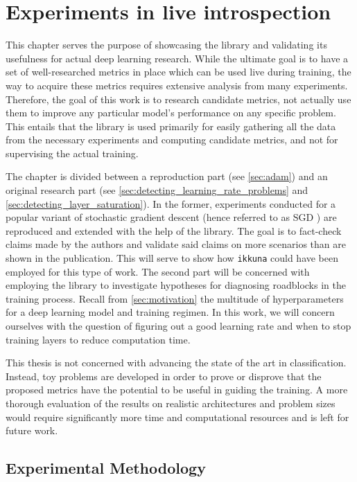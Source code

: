 \chapter{Experiments in live introspection}
\label{ch:experiments}

This chapter serves the purpose of showcasing the library and validating its
usefulness for actual deep learning research. While the ultimate goal is to have
a set of well-researched metrics in place which can be used live during
training, the way to acquire these metrics requires extensive analysis from many
experiments. Therefore, the goal of this work is to research candidate metrics,
not actually use them to improve any particular model's performance on any
specific problem. This entails that the library is used primarily for easily
gathering all the data from the necessary experiments and computing candidate
metrics, and not for supervising the actual training.

The chapter is divided between a reproduction part (see
\cref{sec:adam}) and an original research part (see
\cref{sec:detecting_learning_rate_problems} and
\cref{sec:detecting_layer_saturation}). In the former, experiments conducted
for a popular variant of stochastic gradient descent (hence referred to as SGD
) are reproduced and extended with
the help of the library. The goal is to fact-check claims made by the authors
and validate said claims on more scenarios than are shown in the
publication. This will serve to show how \texttt{ikkuna} could have been
employed for this type of work. The second part will be concerned with employing
the library to investigate hypotheses for diagnosing roadblocks in the training
process. Recall from \cref{sec:motivation} the multitude of hyperparameters
for a deep learning model and training regimen. In this work, we will concern
ourselves with the question of figuring out a good learning rate and when to
stop training layers to reduce computation time.

This thesis is not concerned with advancing the state of the art in
classification. Instead, toy problems are developed in order to prove or
disprove that the proposed metrics have the potential to be useful in guiding
the training. A more thorough evaluation of the results on realistic
architectures and problem sizes would require significantly more time and
computational resources and is left for future work.

\section{Experimental Methodology}%
\label{sec:experimental_methodology}

